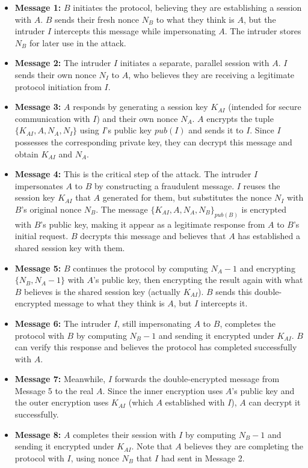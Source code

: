 \documentclass[11pt]{article}
\begin{document}
    \begin{itemize}
        \item \textbf{Message 1:} $B$ initiates the protocol, believing they are establishing a session with $A$. $B$ sends their fresh nonce $N_B$ to what they think is $A$, but the intruder $I$ intercepts this message while impersonating $A$. The intruder stores $N_B$ for later use in the attack.

        \item \textbf{Message 2:} The intruder $I$ initiates a separate, parallel session with $A$. $I$ sends their own nonce $N_I$ to $A$, who believes they are receiving a legitimate protocol initiation from $I$.

        \item \textbf{Message 3:} $A$ responds by generating a session key $K_{AI}$ (intended for secure communication with $I$) and their own nonce $N_A$. $A$ encrypts the tuple $\{K_{AI}, A, N_A, N_I\}$ using $I$'s public key $pub(I)$ and sends it to $I$. Since $I$ possesses the corresponding private key, they can decrypt this message and obtain $K_{AI}$ and $N_A$.

        \item \textbf{Message 4:} This is the critical step of the attack. The intruder $I$ impersonates $A$ to $B$ by constructing a fraudulent message. $I$ reuses the session key $K_{AI}$ that $A$ generated for them, but substitutes the nonce $N_I$ with $B$'s original nonce $N_B$. The message $\{K_{AI}, A, N_A, N_B\}_{pub(B)}$ is encrypted with $B$'s public key, making it appear as a legitimate response from $A$ to $B$'s initial request. $B$ decrypts this message and believes that $A$ has established a shared session key with them.

        \item \textbf{Message 5:} $B$ continues the protocol by computing $N_A - 1$ and encrypting $\{N_B, N_A - 1\}$ with $A$'s public key, then encrypting the result again with what $B$ believes is the shared session key (actually $K_{AI}$). $B$ sends this double-encrypted message to what they think is $A$, but $I$ intercepts it.

        \item \textbf{Message 6:} The intruder $I$, still impersonating $A$ to $B$, completes the protocol with $B$ by computing $N_B - 1$ and sending it encrypted under $K_{AI}$. $B$ can verify this response and believes the protocol has completed successfully with $A$.

        \item \textbf{Message 7:} Meanwhile, $I$ forwards the double-encrypted message from Message 5 to the real $A$. Since the inner encryption uses $A$'s public key and the outer encryption uses $K_{AI}$ (which $A$ established with $I$), $A$ can decrypt it successfully.

        \item \textbf{Message 8:} $A$ completes their session with $I$ by computing $N_B - 1$ and sending it encrypted under $K_{AI}$. Note that $A$ believes they are completing the protocol with $I$, using nonce $N_B$ that $I$ had sent in Message 2.
    \end{itemize}
\end{document}
